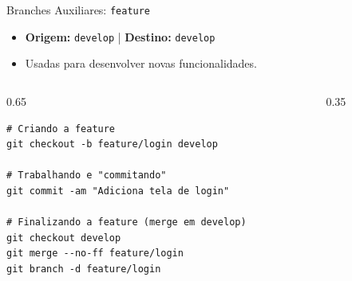 \documentclass[aspectratio=169]{beamer}
\begin{document}
\begin{frame}[fragile]{Branches Auxiliares: \texttt{feature}}
    \begin{itemize}
        \item \textbf{Origem:} \texttt{develop} \quad | \quad \textbf{Destino:} \texttt{develop}
        \item Usadas para desenvolver novas funcionalidades.
    \end{itemize}
    
    \begin{columns}
        \begin{column}{0.65\textwidth}
\begin{lstlisting}
# Criando a feature
git checkout -b feature/login develop

# Trabalhando e "commitando"
git commit -am "Adiciona tela de login"

# Finalizando a feature (merge em develop)
git checkout develop
git merge --no-ff feature/login
git branch -d feature/login
\end{lstlisting}
        \end{column}
        \begin{column}{0.35\textwidth}
            \begin{center}
            \end{center}
        \end{column}
    \end{columns}
\end{frame}
\end{document}
